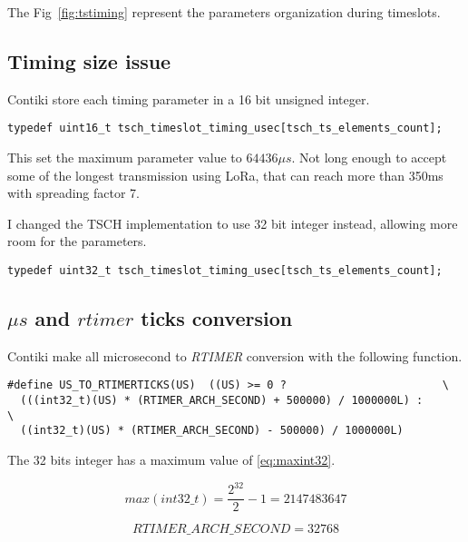 The Fig~\ref{fig:tstiming} represent the parameters organization during
timeslots.



\subsection{Timing size issue}

Contiki store each timing parameter in a 16 bit unsigned integer.

\begin{lstlisting}
typedef uint16_t tsch_timeslot_timing_usec[tsch_ts_elements_count];
\end{lstlisting}

This set the maximum parameter value to $64436\mu s$.
Not long enough to accept some of the longest transmission using LoRa, that can
reach more than 350ms with spreading factor 7.

I changed the TSCH implementation to use 32 bit integer instead, allowing more
room for the parameters.

\begin{lstlisting}
typedef uint32_t tsch_timeslot_timing_usec[tsch_ts_elements_count];
\end{lstlisting}

\subsection{$\mu s$ and $rtimer$ ticks conversion}

Contiki make all microsecond to \emph{RTIMER} conversion with the following
function.

\begin{lstlisting}
#define US_TO_RTIMERTICKS(US)  ((US) >= 0 ?                        \
  (((int32_t)(US) * (RTIMER_ARCH_SECOND) + 500000) / 1000000L) :      \
  ((int32_t)(US) * (RTIMER_ARCH_SECOND) - 500000) / 1000000L)
\end{lstlisting}

The 32 bits integer has a maximum value of \ref{eq:maxint32}.

\begin{equation}
  \label{eq:maxint32}
  max(int32\_t) = \frac{2^{32}}{2} - 1 = 2147483647
\end{equation}

\begin{equation}
  \label{eq:rtimersecond}
  RTIMER\_ARCH\_SECOND = 32768
\end{equation}


